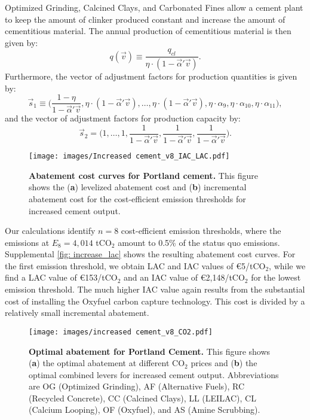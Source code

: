 \documentclass[12pt, a4paper]{article} %
\newcommand{\Suppl}{Supplemental}
\begin{document}
Optimized Grinding, Calcined Clays, and Carbonated Fines allow a cement plant to keep the amount of clinker produced constant and increase the amount of cementitious material. The annual production of cementitious material is then given by:
$$q(\vec{v}) \equiv \frac{q_{cl}}{\eta \cdot (1 - \vec{\alpha}'\vec{v})}.$$
Furthermore, the vector of adjustment factors for production quantities is given by:
$$\vec{s}_1 \equiv \bigl(\frac{1-\eta}{1-\vec{\alpha}'\vec{v}}, \eta \cdot (1-\vec{\alpha}'\vec{v}), \ldots, \eta \cdot (1-\vec{\alpha}'\vec{v}), \eta \cdot \alpha_9, \eta \cdot \alpha_{10}, \eta \cdot \alpha_{11}\bigr),$$
and the vector of adjustment factors for production capacity by:
$$\vec{s}_2 = \bigl(1, \ldots, 1, \frac{1}{1-\vec{\alpha}'\vec{v}}, \frac{1}{1-\vec{\alpha}'\vec{v}}, \frac{1}{1-\vec{\alpha}'\vec{v}}\bigr).$$

\begin{figure}[ht]
\centering
\texttt{[image: images/Increased cement\_v8\_IAC\_LAC.pdf]}
\caption{\textbf{Abatement cost curves for Portland cement.} This figure shows the (\textbf{a}) levelized abatement cost and (\textbf{b}) incremental abatement cost for the cost-efficient emission thresholds for increased cement output.}
\label{fig: increase_lac}
\end{figure}

Our calculations identify $n=8$ cost-efficient emission thresholds, where the emissions at $E_{8} = 4,014$ tCO$_2$ amount to 0.5\% of the status quo emissions. \Suppl$ $ \autoref{fig: increase_lac} shows the resulting abatement cost curves. For the first emission threshold, we obtain LAC and IAC values of \euro 5/tCO$_2$, while we find a LAC value of \euro 153/tCO$_2$ and an IAC value of \euro 2,148/tCO$_2$ for the lowest emission threshold. The much higher IAC value again results from the substantial cost of installing the Oxyfuel carbon capture technology. This cost is divided by a relatively small incremental abatement. 

\begin{figure}[ht]
\centering
\texttt{[image: images/increased cement\_v8\_CO2.pdf]}
\caption{\textbf{Optimal abatement for Portland Cement.} This figure shows (\textbf{a}) the optimal abatement at different CO$_2$ prices and (\textbf{b}) the optimal combined levers for increased cement output. Abbreviations are OG (Optimized Grinding), AF (Alternative Fuels), RC (Recycled Concrete), CC (Calcined Clays), LL (LEILAC), CL (Calcium Looping), OF (Oxyfuel), and AS (Amine Scrubbing).}
\label{fig: increase_value}
\end{figure}
\end{document}
